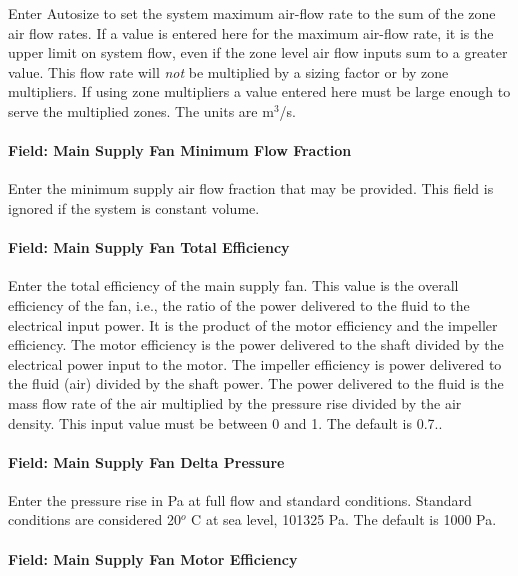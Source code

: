 Enter Autosize to set the system maximum air-flow rate to the sum of the zone air flow rates. If a value is entered here for the maximum air-flow rate, it is the upper limit on system flow, even if the zone level air flow inputs sum to a greater value. This flow rate will \emph{not} be multiplied by a sizing factor or by zone multipliers. If using zone multipliers a value entered here must be large enough to serve the multiplied zones. The units are m\(^{3}\)/s.

\paragraph{Field: Main Supply Fan Minimum Flow Fraction}\label{field-main-supply-fan-minimum-flow-fraction}

Enter the minimum supply air flow fraction that may be provided. This field is ignored if the system is constant volume.

\paragraph{Field: Main Supply Fan Total Efficiency}\label{field-main-supply-fan-total-efficiency}

Enter the total efficiency of the main supply fan. This value is the overall efficiency of the fan, i.e., the ratio of the power delivered to the fluid to the electrical input power. It is the product of the motor efficiency and the impeller efficiency. The motor efficiency is the power delivered to the shaft divided by the electrical power input to the motor. The impeller efficiency is power delivered to the fluid (air) divided by the shaft power. The power delivered to the fluid is the mass flow rate of the air multiplied by the pressure rise divided by the air density. This input value must be between 0 and 1. The default is 0.7..

\paragraph{Field: Main Supply Fan Delta Pressure}\label{field-main-supply-fan-delta-pressure}

Enter the pressure rise in Pa at full flow and standard conditions. Standard conditions are considered 20\(^{o}\) C at sea level, 101325 Pa. The default is 1000 Pa.

\paragraph{Field: Main Supply Fan Motor Efficiency}\label{field-main-supply-fan-motor-efficiency}

